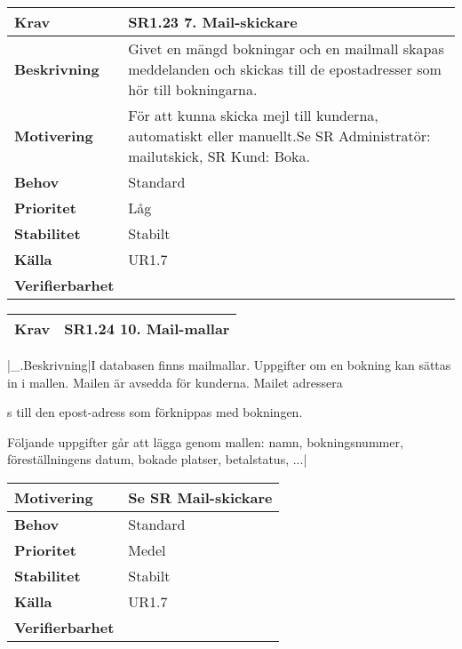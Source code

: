 \documentclass[a4paper, twoside, 11pt, titlepage]{article}
\begin{document}
	\begin{tabular} { p{2.6cm} p{12.5cm} }
		\hline
		\sffamily\textbf{Krav} & \sffamily\textbf{SR1.23 7. Mail-skickare } \\
		\hline
		\sffamily\textbf{Beskrivning} & Givet en mängd bokningar och en mailmall skapas meddelanden och skickas till de epostadresser som hör till bokningarna.  \\
		\hline
		\sffamily\textbf{Motivering} & För att kunna skicka mejl till kunderna, automatiskt eller manuellt.Se SR Administratör: mailutskick, SR Kund: Boka.  \\
		\hline
		\sffamily\textbf{Behov} & Standard  \\
		\hline
		\sffamily\textbf{Prioritet} & Låg  \\
		\hline
		\sffamily\textbf{Stabilitet} & Stabilt  \\
		\hline
		\sffamily\textbf{Källa} & UR1.7  \\
		\hline
		\sffamily\textbf{Verifierbarhet} &   \\
		\hline
	\end{tabular}
	\vspace{6mm}

	\begin{tabular} { p{2.6cm} p{12.5cm} }
		\hline
		\sffamily\textbf{Krav} & \sffamily\textbf{SR1.24 10. Mail-mallar } \\
		\hline
	\end{tabular}
	\vspace{6mm}

	|\_.Beskrivning|I databasen finns mailmallar. Uppgifter om en bokning kan sättas in i mallen. Mailen är avsedda för kunderna. Mailet adressera

	s till den epost-adress som förknippas med bokningen.

	Följande uppgifter går att lägga genom mallen: namn, bokningsnummer, föreställningens datum, bokade platser, betalstatus, ...|

	\begin{tabular} { p{2.6cm} p{12.5cm} }
		\hline
		\sffamily\textbf{Motivering} & Se SR Mail-skickare  \\
		\hline
		\sffamily\textbf{Behov} & Standard  \\
		\hline
		\sffamily\textbf{Prioritet} & Medel  \\
		\hline
		\sffamily\textbf{Stabilitet} & Stabilt  \\
		\hline
		\sffamily\textbf{Källa} & UR1.7  \\
		\hline
		\sffamily\textbf{Verifierbarhet} &   \\
		\hline
	\end{tabular}
	\vspace{6mm}
\end{document}
